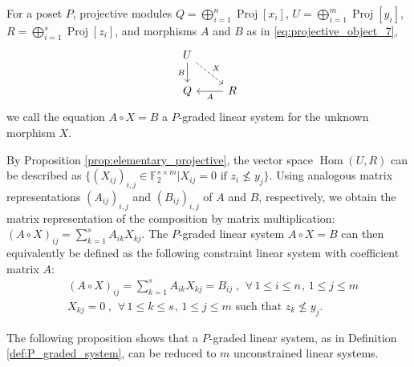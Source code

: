 \documentclass[english,a4paper,nolineno,cleveref]{socg-lipics-v2021}
\DeclareMathOperator{\Hom}{Hom}
\DeclareMathOperator{\proj}{Proj}
\begin{document}
\begin{definition} \label{def:P_graded_system}
For a poset $P$, projective modules $Q=\bigoplus_{i=1}^n \proj[x_i]$, $U=\bigoplus_{i=1}^m \proj[y_i]$, $R=\bigoplus_{i=1}^s \proj[z_i]$, and morphisms $A$ and $B$ as in \eqref{eq:projective_object_7}, 
\begin{equation} \label{eq:projective_object_7}
\begin{tikzcd}
U \arrow[d,swap,"B"] \arrow[dr,dashed,"X"] \\
Q  & R \arrow[l,"A"]
\end{tikzcd}
\end{equation}
we call the equation $A\circ X=B$ a $P$-graded linear system for the unknown morphism $X$. 

By Proposition \ref{prop:elementary_projective}, the vector space $\Hom(U,R)$ can be described as $\{(X_{ij})_{i,j}\in \mathbb{F}_2^{s\times m}\vert X_{ij}=0\text{ if }z_i\nleq y_j\}$. Using analogous matrix representations $(A_{ij})_{i,j}$ and $(B_{ij})_{i,j}$ of $A$ and $B$, respectively, we obtain the matrix representation of the composition by matrix multiplication: $(A\circ X)_{ij}=\sum_{k=1}^s A_{ik}X_{kj}$. The $P$-graded linear system $A\circ X=B$ can then equivalently be defined as the following constraint linear system with coefficient matrix $A$:
\begin{equation} \label{eq:P_linear_system}
\begin{aligned}
& (A\circ X)_{ij}=\sum_{k=1}^s A_{ik}X_{kj}=B_{ij} \hspace{3pt},\hspace{5pt} \forall\hspace{2pt} 1\leq i \leq n \hspace{1pt}, \hspace{2pt}1\leq j\leq m \\
& X_{kj}=0 \hspace{3pt},\hspace{5pt}\forall\hspace{2pt} 1\leq k \leq s \hspace{1pt}, \hspace{2pt}1\leq j\leq m \text{ such that }  z_k\nleq y_j .
\end{aligned}
\end{equation}
\end{definition}

The following proposition shows that a $P$-graded linear system, as in Definition \ref{def:P_graded_system}, can be reduced to $m$ unconstrained linear systems. 
\end{document}
